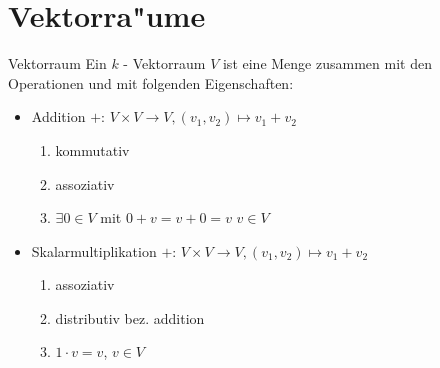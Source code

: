 \documentclass[11pt]{article}
\begin{document}
\section{Vektorra"ume}
\label{sec:org4906e00}
\begin{definition}{Vektorraum}{}
Ein \(k\) - Vektorraum \(V\) ist eine Menge zusammen mit den Operationen und mit
folgenden Eigenschaften:
\begin{itemize}
\item Addition \(+:\, V\times V \to V, (v_1,v_2)\mapsto v_1+v_2\)
\begin{enumerate}
\item kommutativ
\item assoziativ
\item \(\exists 0 \in V\) mit \(0+v=v+0=v\) \(v \in V\)
\end{enumerate}
\item Skalarmultiplikation \(+:\, V\times V \to V, (v_1,v_2)\mapsto v_1+v_2\)
\begin{enumerate}
\item assoziativ
\item distributiv bez. addition
\item \(1\cdot v = v\), \(v\in V\)
\end{enumerate}
\end{itemize}
\end{definition}
\end{document}
